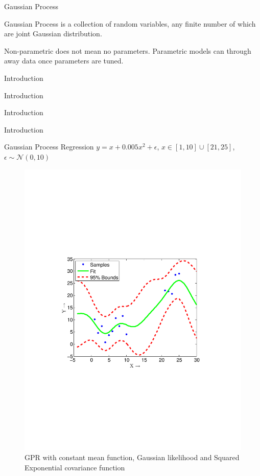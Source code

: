 \begin{frame}{Gaussian Process}
    \begin{block}
        Gaussian Process is a collection of random variables, any finite number
        of which are joint Gaussian distribution.
    \end{block}
    Non-parametric does not mean no parameters. Parametric models can through
    away data once parameters are tuned.
\end{frame}

\begin{frame}{Introduction}

\end{frame}

\begin{frame}{Introduction}

\end{frame}

\begin{frame}{Introduction}

\end{frame}

\begin{frame}{Introduction}

\end{frame}

\begin{frame}{Gaussian Process Regression}
$y = x+0.005x^2+ \epsilon$, $x \in [1,10] \cup [21,25]$,  $\epsilon \sim \mathcal{N}(0,10)$ 
\begin{figure}
\centering
\includegraphics[width=0.5\linewidth,trim=30mm 80mm 40mm 70mm,clip]{figures/gpml_fit}
\caption{ GPR with constant mean function, Gaussian likelihood and Squared Exponential covariance function}
\end{figure}
\end{frame}


